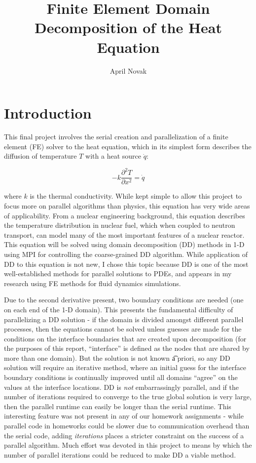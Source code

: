 \documentclass[10pt]{article}
\title{Finite Element Domain Decomposition of the Heat Equation}
\author{April Novak}
\newcommand{\beq}{\begin{equation}}
\newcommand{\eeq}{\end{equation}}
\begin{document}
\maketitle

\section{Introduction}

This final project involves the serial creation and parallelization of a finite element (FE) solver to the heat equation, which in its simplest form describes the diffusion of temperature \(T\) with a heat source \(\dot{q}\):

\beq
\label{eq:eq}
-k\frac{\partial^2 T}{\partial x^2}=\dot{q}
\eeq

where \(k\) is the thermal conductivity. While kept simple to allow this project to focus more on parallel algorithms than physics, this equation has very wide areas of applicability. From a nuclear engineering background, this equation describes the temperature distribution in nuclear fuel, which when coupled to neutron transport, can model many of the most important features of a nuclear reactor. This equation will be solved using domain decomposition (DD) methods in 1-D using MPI for controlling the coarse-grained DD algorithm. While application of DD to this equation is not new, I chose this topic because DD is one of the most well-established methods for parallel solutions to PDEs, and appears in my research using FE methods for fluid dynamics simulations.

Due to the second derivative present, two boundary conditions are needed (one on each end of the 1-D domain). This presents the fundamental difficulty of parallelizing a DD solution - if the domain is divided amongst different parallel processes, then the equations cannot be solved unless guesses are made for the conditions on the interface boundaries that are created upon decomposition (for the purposes of this report, ``interface'' is defined as the nodes that are shared by more than one domain). But the solution is not known {\t a priori}, so any DD solution will require an iterative method, where an initial guess for the interface boundary conditions is continually improved until all domains ``agree'' on the values at the interface locations. DD is \textit{not} embarrassingly parallel, and if the number of iterations required to converge to the true global solution is very large, then the parallel runtime can easily be longer than the serial runtime. This interesting feature was not present in any of our homework assignments - while parallel code in homeworks could be slower due to communication overhead than the serial code, adding {\it iterations} places a stricter constraint on the success of a parallel algorithm. Much effort was devoted in this project to means by which the number of parallel iterations could be reduced to make DD a viable method.
\end{document}
